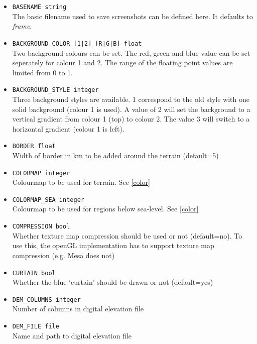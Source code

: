 \begin{itemize}
\item \texttt{BASENAME string}\\
The basic filename used to save screenshots can be defined here. It defaults to \emph{frame}.

\item \texttt{BACKGROUND\_COLOR\_[1|2]\_[R|G|B] float} \\
Two background colours can be set. The red, green and blue-value can be set seperately for colour 1 and 2.
The range of the floating point values are limited from 0 to 1.

\item \texttt{BACKGROUND\_STYLE integer} \\
Three background styles are available. 1 correspond to the old style with one solid background (colour 1 is used). A value of 2
will set the background to a vertical gradient from colour 1 (top) to colour 2. The value 3 will switch to a horizontal gradient
(colour 1 is left).

\item \texttt{BORDER float} \\
Width of border in km to be added around the terrain (default=5)

\item \texttt{COLORMAP integer} \\
Colourmap to be used for terrain. See \ref{color}

\item \texttt{COLORMAP\_SEA integer} \\
Colourmap to be used for regions below sea-level. See \ref{color}

\item \texttt{COMPRESSION bool} \\
Whether texture map compression should be used or not (default=no). To use this, the openGL implementation has to support texture map compression (e.g. Mesa does not)

\item \texttt{CURTAIN bool} \\
Whether the blue `curtain' should be drawn or not (default=yes)

\item \texttt{DEM\_COLUMNS integer} \\
Number of columns in digital elevation file

\item \texttt{DEM\_FILE file} \\
Name and path to digital elevation file


\end{itemize}
